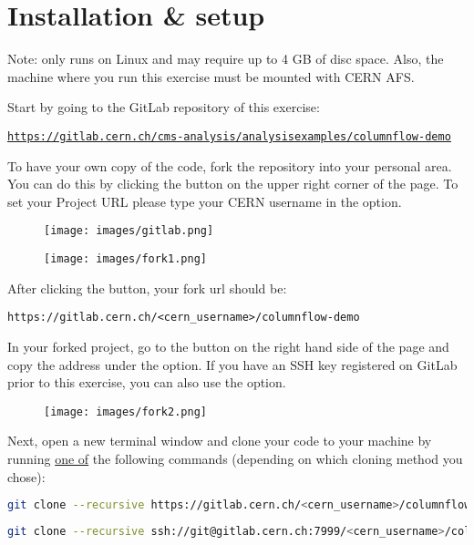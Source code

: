 \section{Installation \& setup}
\justifying
\begin{tcolorbox}[colback=green!5!white,colframe=green!75!black,width=\textwidth]
Note: \columnflow only runs on Linux and may require up to 4 GB of disc space. \tcblower
Also, the machine where you run this exercise must be mounted with CERN AFS.
\end{tcolorbox}

Start by going to the GitLab repository of this exercise:

\texttt{\textcolor{LimeGreen}{\href{https://gitlab.cern.ch/cms-analysis/analysisexamples/columnflow-demo}{\underline{https://gitlab.cern.ch/cms-analysis/analysisexamples/columnflow-demo}}}}

To have your own copy of the code, fork the repository into your personal area. You can do this by clicking the  button on the upper right corner of the page. To set your Project URL please type your CERN username in the  option.

\begin{figure}[!h]
    \centering
    \texttt{[image: images/gitlab.png]}
\end{figure}
\begin{figure}[!h]
    \centering
    \texttt{[image: images/fork1.png]}
\end{figure}

After clicking the  button, your fork url should be:

\texttt{https://gitlab.cern.ch/<cern\_username>/columnflow-demo}

\newpage
In your forked project, go to the  button on the right hand side of the page and copy the address under the  option. If you have an SSH key registered on GitLab prior to this exercise, you can also use the  option.

\begin{figure}[!h]
    \centering
    \texttt{[image: images/fork2.png]}
\end{figure}

Next, open a new terminal window and clone your code to your machine by running \underline{one of} the following commands (depending on which cloning method you chose):

\begin{lstlisting}[language=bash]
git clone --recursive https://gitlab.cern.ch/<cern_username>/columnflow-demo.git
\end{lstlisting}
\begin{lstlisting}[language=bash]
git clone --recursive ssh://git@gitlab.cern.ch:7999/<cern_username>/columnflow-demo.git
\end{lstlisting}

